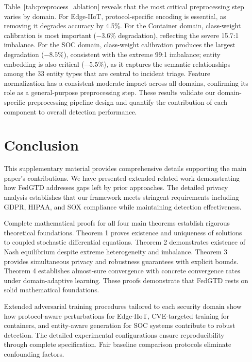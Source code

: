 \documentclass[12pt,a4paper]{article}
\theoremstyle{definition}
\begin{document}
{Table~\ref{tab:preprocess_ablation} reveals that the most critical preprocessing step varies by domain. For Edge-IIoT, protocol-specific encoding is essential, as removing it degrades accuracy by 4.5\%. For the Container domain, class-weight calibration is most important ($-3.6\%$ degradation), reflecting the severe 15.7:1 imbalance. For the SOC domain, class-weight calibration produces the largest degradation ($-8.5\%$), consistent with the extreme 99:1 imbalance; entity embedding is also critical ($-5.5\%$), as it captures the semantic relationships among the 33 entity types that are central to incident triage. Feature normalization has a consistent moderate impact across all domains, confirming its role as a general-purpose preprocessing step. These results validate our domain-specific preprocessing pipeline design and quantify the contribution of each component to overall detection performance.
}

\section{Conclusion}

This supplementary material provides comprehensive details supporting the main paper's contributions. We have presented extended related work demonstrating how FedGTD addresses gaps left by prior approaches. The detailed privacy analysis establishes that our framework meets stringent requirements including GDPR, HIPAA, and SOX compliance while maintaining detection effectiveness.

Complete mathematical proofs for all four main theorems establish rigorous theoretical foundations. Theorem 1 proves existence and uniqueness of solutions to coupled stochastic differential equations. Theorem 2 demonstrates existence of Nash equilibrium despite extreme heterogeneity and imbalance. Theorem 3 provides simultaneous privacy and robustness guarantees with explicit bounds. Theorem 4 establishes almost-sure convergence with concrete convergence rates under domain-adaptive learning. These proofs demonstrate that FedGTD rests on solid mathematical foundations.

Extended adversarial training procedures tailored to each security domain show how protocol-aware perturbations for Edge-IIoT, CVE-targeted training for containers, and entity-aware generation for SOC systems contribute to robust detection. The detailed experimental configurations ensure reproducibility through complete specification. Fair baseline comparison protocols eliminate confounding factors.
\end{document}
